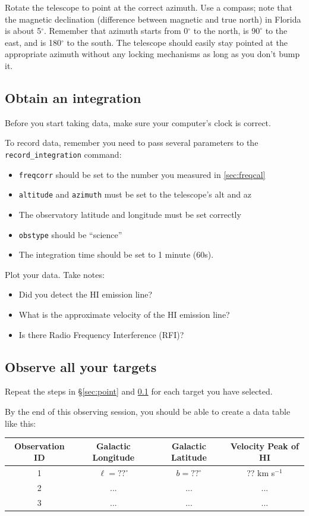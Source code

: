 \documentclass[11pt]{article}
\begin{document}
Rotate the telescope to point at the correct azimuth.
Use a compass; note that the magnetic declination (difference between magnetic
and true north) in Florida is about 5$^\circ$.
Remember that azimuth starts from 0$^\circ$ to the north, is $90^\circ$ to the east,
and is 180$^\circ$ to the south.
The telescope should easily stay pointed at the appropriate azimuth without
any locking mechanisms as long as you don't bump it.


\subsection{Obtain an integration}
\label{sec:integrate}
Before you start taking data, make sure your computer's clock is correct.

To record data, remember you need to pass several parameters to the \verb|record_integration| command:
\begin{itemize}
    \item \verb|freqcorr| should be set to the number you measured in \ref{sec:freqcal}
    \item \verb|altitude| and \verb|azimuth| must be set to the telescope's alt and az
    \item The observatory latitude and longitude must be set correctly
    \item \verb|obstype| should be ``science''
    \item The integration time should be set to 1 minute (60s).
\end{itemize}

Plot your data.  Take notes:
\begin{itemize}
    \item Did you detect the HI emission line?
    \item What is the approximate velocity of the HI emission line?
    \item Is there Radio Frequency Interference (RFI)?
\end{itemize}

\subsection{Observe all your targets}

Repeat the steps in \S \ref{sec:point} and \ref{sec:integrate} for each target you have selected.

By the end of this observing session, you should be able to create a data table like this:

\begin{tabular}{|c|c|c|c|}
\hline
 Observation ID &   Galactic Longitude & Galactic Latitude & Velocity Peak of HI \\
\hline
 1  & $\ell= ?? ^\circ$ & $b= ?? ^\circ$ & ?? km s$^{-1}$ \\
 \hline
 2  & ... & ... & ... \\
 \hline
 3  & ... & ... & ... \\
 \hline
\end{tabular}
\end{document}
